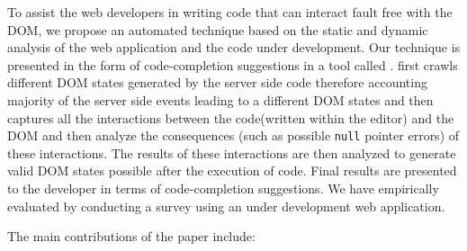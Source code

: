 To assist the web developers in writing \javascript code that can interact fault free with the DOM, we propose an automated technique based on the static and dynamic analysis of the web application and the \javascript code under development. Our technique is presented in the form of code-completion suggestions in a tool called \dompletion. \dompletion first crawls different DOM states generated by the server side code therefore accounting majority of the server side events leading to a different DOM states and then captures all the interactions between the \javascript code(written within the editor) and the DOM and then analyze the consequences (such as possible \texttt{null} pointer errors) of these interactions. The results of these interactions are then analyzed to generate valid DOM states possible after the execution of \javascript code. Final results are presented to the developer in terms of code-completion suggestions. We have empirically evaluated \dompletion by conducting a survey using an under development web application. 


The main contributions of the paper include: \\ \\ \\ \\ \\ \\ \\ \\ \\ \\ \\ \\ \\ \\ \\ \\ \\ \\ \\ \\ \\ \\